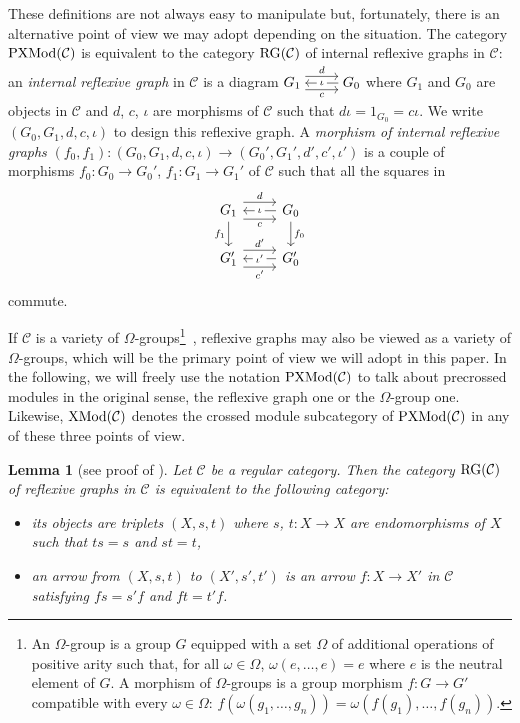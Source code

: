 \documentclass[a4paper, british, reqno]{amsart}
\newcommand*{\from}{\colon}
\newcommand*{\CatSymb}[1]{\mathcal{#1}}
\newcommand*{\CatName}[1]{\textnormal{#1}}
\newcommand*{\defn}[1]{\emph{#1}}
\newcommand*{\C}{\CatSymb{C}}
\newcommand*{\PXMod}{\CatName{PXMod}}
\newcommand*{\XMod}{\CatName{XMod}}
\newcommand*{\RG}{\CatName{RG}}
\newtheorem{lemma}[theorem]{Lemma}
\theoremstyle{definition}
\theoremstyle{remark}
\begin{document}
These definitions are not always easy to manipulate but, fortunately, there is an alternative point of view we may adopt depending on the situation. The category \(\PXMod(\C)\) is equivalent to the category \(\RG(\C)\)\label{def - usual def RG} of internal reflexive graphs in \(\C\): an \defn{internal reflexive graph} in \(\C\) is a diagram \(\begin{tikzcd}[cramped] G_1 \arrow[r, "d", shift left=2] \arrow[r, "c"', shift right=2] & G_0 \arrow[l, "\iota" description]\end{tikzcd}\) where \(G_1\) and \(G_0\) are objects in \(\C\) and \(d\), \(c\), \(\iota\) are morphisms of \(\C\) such that \(d\iota=1_{G_0}=c\iota\). We write \((G_0,G_1, d,c, \iota)\) to design this reflexive graph. A \defn{morphism of internal reflexive graphs} \((f_0,f_1)\colon (G_0,G_1, d,c, \iota)\to (G_0',G_1', d',c', \iota')\) is a couple of morphisms \(f_0\colon G_0\to G_0'\), \(f_1\colon G_1\to G_1'\) of \(\C\) such that all the squares in
\[
	\begin{tikzcd}
		G_1 \arrow[r, "d", shift left=2.5] \arrow[r, "c"', shift right=2.5] \arrow[d, "f_1"'] & G_0 \arrow[l, "\iota" description] \arrow[d, "f_0"] \\
		G_1' \arrow[r, "d'", shift left=2.5] \arrow[r, "c'"', shift right=2.5]                & G_0' \arrow[l, "\iota'" description]
	\end{tikzcd}
\]
commute.


If \(\C\) is a variety of \(\Omega\)-groups\footnote{An \(\Omega\)-group is a group \(G\) equipped with a set \(\Omega\) of additional operations of positive arity such that, for all \(\omega\in \Omega\), \(\omega(e,\dots, e)=e\) where \(e\) is the neutral element of \(G\). A morphism of \(\Omega\)-groups is a group morphism \(f\from G\to G'\) compatible with every \(\omega\in \Omega\): \(f(\omega(g_1,\dots, g_n))=\omega(f(g_1),\dots, f(g_n))\).}~\cite{Hig56}, reflexive graphs may also be viewed as a variety of \(\Omega\)-groups, which will be the primary point of view we will adopt in this paper. In the following, we will freely use the notation \(\PXMod(\C)\) to talk about precrossed modules in the original sense, the reflexive graph one or the \(\Omega\)-group one. Likewise, \(\XMod(\C)\) denotes the crossed module subcategory of \(\PXMod(\C)\) in any of these three points of view.

\begin{lemma}[see proof of {\cite[Proposition~2.3]{GR04}}]
	\label{lemma - RG(V) variety}
	Let \(\C\) be a regular category. Then the category \(\RG(\C)\) of reflexive graphs in \(\C\) is equivalent to the following category:
	\begin{itemize}
		\item its objects are triplets \((X,s,t)\) where \(s\), \(t\from X\to X\) are endomorphisms of \(X\) such that \(ts=s\) and \(st=t\),
		\item an arrow from \((X,s,t)\) to \((X',s',t')\) is an arrow \(f\from X\to X'\) in \(\C\) satisfying \(fs=s'f\) and \(ft=t'f\).
	\end{itemize}
\end{lemma}
\end{document}
